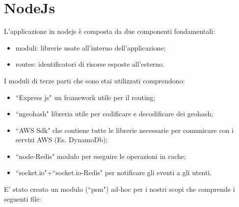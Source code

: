 \section{NodeJs}
L'applicazione in nodejs è composta da due componenti fondamentali:
\begin{itemize}
	\item moduli: librerie usate all'interno dell'applicazione;
	\item routes: identificatori di risorse esposte all'esterno.
\end{itemize}
I moduli di terze parti che sono stai utilizzati comprendono:
\begin{itemize}
 	\item ``Express js" un framework utile per il routing;
	\item ``ngeohash" libreria utile per codificare e decodificare dei geohash;
	\item ``AWS Sdk" che contiene tutte le librerie necessarie per comunicare con i servizi AWS (Es. DynamoDb);
	\item ``node-Redis" modulo per eseguire le operazioni in cache;
	\item ``socket.io"+``socket.io-Redis" per notificare gli eventi a gli utenti.
 \end{itemize}
E' stato creato un modulo (``psm") ad-hoc per i nostri scopi che comprende i seguenti file:
